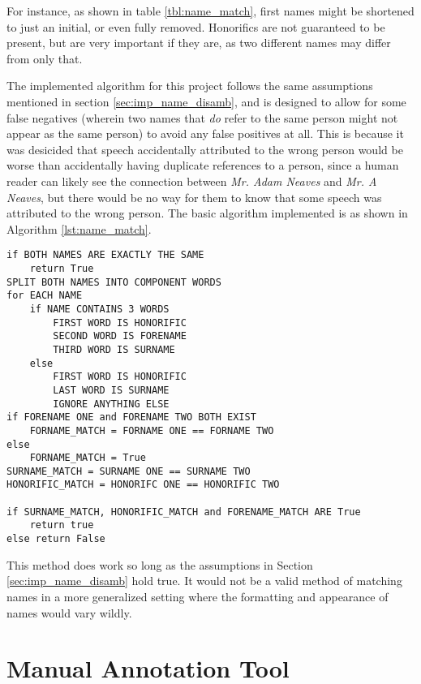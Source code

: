 For instance, as shown in table \ref{tbl:name_match}, first names might be shortened to just an initial, or even fully removed. Honorifics are not guaranteed to be present, but are very important if they are, as two different names may differ from only that.

The implemented algorithm for this project follows the same assumptions mentioned in section \ref{sec:imp_name_disamb}, and is designed to allow for some false negatives (wherein two names that \emph{do} refer to the same person might not appear as the same person) to avoid any false positives at all. This is because it was desicided that speech accidentally attributed to the wrong person would be worse than accidentally having duplicate references to a person, since a human reader can likely see the connection between \emph{Mr. Adam Neaves} and \emph{Mr. A Neaves}, but there would be no way for them to know that some speech was attributed to the wrong person. The basic algorithm implemented is as shown in Algorithm \ref{lst:name_match}.
\begin{lstlisting}[float=ht,
				   caption={Pseudocode representing the name matching method},
				   label={lst:name_match}]
if BOTH NAMES ARE EXACTLY THE SAME
	return True
SPLIT BOTH NAMES INTO COMPONENT WORDS
for EACH NAME
	if NAME CONTAINS 3 WORDS
		FIRST WORD IS HONORIFIC
		SECOND WORD IS FORENAME
		THIRD WORD IS SURNAME
	else
		FIRST WORD IS HONORIFIC
		LAST WORD IS SURNAME
		IGNORE ANYTHING ELSE
if FORENAME ONE and FORENAME TWO BOTH EXIST
	FORNAME_MATCH = FORNAME ONE == FORNAME TWO
else
	FORNAME_MATCH = True
SURNAME_MATCH = SURNAME ONE == SURNAME TWO
HONORIFIC_MATCH = HONORIFC ONE == HONORIFIC TWO

if SURNAME_MATCH, HONORIFIC_MATCH and FORENAME_MATCH ARE True
	return true
else return False
\end{lstlisting}

This method does work so long as the assumptions in Section \ref{sec:imp_name_disamb} hold true. It would not be a valid method of matching names in a more generalized setting where the formatting and appearance of names would vary wildly.

\section{Manual Annotation Tool}
\label{sec:imp_annotation_tool}